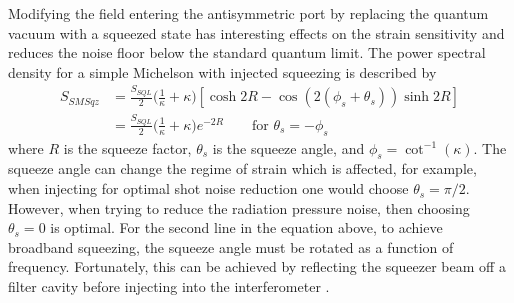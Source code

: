 	Modifying the field entering the antisymmetric port by replacing the quantum vacuum with a squeezed state has interesting effects on the strain sensitivity and reduces the noise floor below the standard quantum limit. The power spectral density for a simple Michelson with injected squeezing is described by \cite{KimbleConversion}
	\begin{equation}
	\begin{aligned}
	S_{SM Sqz} 	&=  \frac{S_{SQL}}{2} \bigg( \frac{1}{\kappa}  + \kappa\bigg) [\cosh{2R} - \cos(2(\phi_s+\theta_s)) \sinh{2R}]\\
	&= \frac{S_{SQL}}{2} \bigg( \frac{1}{\kappa}  + \kappa\bigg) e^{-2R} \qquad \text{for } \theta_s = -\phi_s
	\end{aligned}
	\end{equation}
	where $R$ is the squeeze factor, $\theta_s$ is the squeeze angle, and $\phi_s = \cot^{-1}(\kappa)$.  The squeeze angle can change the regime of strain which is affected, for example, when injecting for optimal shot noise reduction one would choose $\theta_s=\pi/2$.  However, when trying to reduce the radiation pressure noise, then choosing $\theta_s=0$ is optimal.   For the second line in the equation above, to achieve broadband squeezing, the squeeze angle must be rotated as a function of frequency.  Fortunately, this can be achieved by reflecting the squeezer beam off a filter cavity before injecting into the interferometer \cite{Oelker_FD_sqz} \cite{EvansRealistic}.
	
